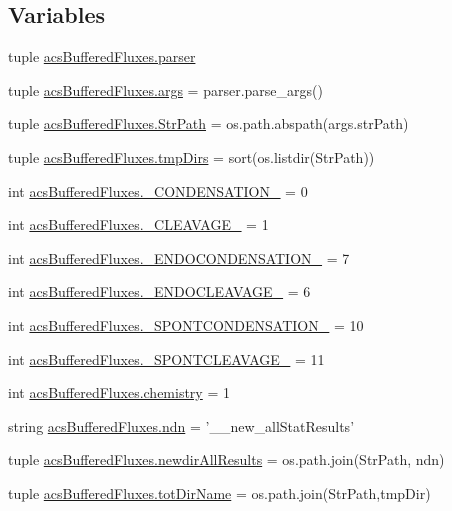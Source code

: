\subsection*{Variables}
\begin{DoxyCompactItemize}
\item 
tuple \hyperlink{a00124_adba84e3872cb47cad219837458e56677}{acs\-Buffered\-Fluxes.\-parser}
\item 
tuple \hyperlink{a00124_afa2d0b9fb021746e05cd06277997da04}{acs\-Buffered\-Fluxes.\-args} = parser.\-parse\-\_\-args()
\item 
tuple \hyperlink{a00124_a82e861baaf9ae17ee61c8105afcffb8d}{acs\-Buffered\-Fluxes.\-Str\-Path} = os.\-path.\-abspath(args.\-str\-Path)
\item 
tuple \hyperlink{a00124_af740eb0100dc7010628161baeaf9b474}{acs\-Buffered\-Fluxes.\-tmp\-Dirs} = sort(os.\-listdir(Str\-Path))
\item 
int \hyperlink{a00124_aad87b9d241bea71df95c318686aca066}{acs\-Buffered\-Fluxes.\-\_\-\-C\-O\-N\-D\-E\-N\-S\-A\-T\-I\-O\-N\-\_\-} = 0
\item 
int \hyperlink{a00124_af81d6d0377f4d99177961a5604f58ed2}{acs\-Buffered\-Fluxes.\-\_\-\-C\-L\-E\-A\-V\-A\-G\-E\-\_\-} = 1
\item 
int \hyperlink{a00124_a0637697acae236afe5e5ae8dc1d85431}{acs\-Buffered\-Fluxes.\-\_\-\-E\-N\-D\-O\-C\-O\-N\-D\-E\-N\-S\-A\-T\-I\-O\-N\-\_\-} = 7
\item 
int \hyperlink{a00124_a4535f1f4043aef3195766733626b61e4}{acs\-Buffered\-Fluxes.\-\_\-\-E\-N\-D\-O\-C\-L\-E\-A\-V\-A\-G\-E\-\_\-} = 6
\item 
int \hyperlink{a00124_a33ff8ddc4a26ccd45029e2b369391aba}{acs\-Buffered\-Fluxes.\-\_\-\-S\-P\-O\-N\-T\-C\-O\-N\-D\-E\-N\-S\-A\-T\-I\-O\-N\-\_\-} = 10
\item 
int \hyperlink{a00124_a485cf1077a4ece847800617ede00e458}{acs\-Buffered\-Fluxes.\-\_\-\-S\-P\-O\-N\-T\-C\-L\-E\-A\-V\-A\-G\-E\-\_\-} = 11
\item 
int \hyperlink{a00124_ab4fd705796fd835a4238fecdc3caf76e}{acs\-Buffered\-Fluxes.\-chemistry} = 1
\item 
string \hyperlink{a00124_a5df7e71a36351afd3e59d6f50a94bdaf}{acs\-Buffered\-Fluxes.\-ndn} = '\-\_\-\_\-new\-\_\-all\-Stat\-Results'
\item 
tuple \hyperlink{a00124_ae53bd92b0509a8f35e92e734a7f4b4e1}{acs\-Buffered\-Fluxes.\-newdir\-All\-Results} = os.\-path.\-join(Str\-Path, ndn)
\item 
tuple \hyperlink{a00124_a7883e37b9556e49968e7a7dd08893bfb}{acs\-Buffered\-Fluxes.\-tot\-Dir\-Name} = os.\-path.\-join(Str\-Path,tmp\-Dir)

\end{DoxyCompactItemize}
